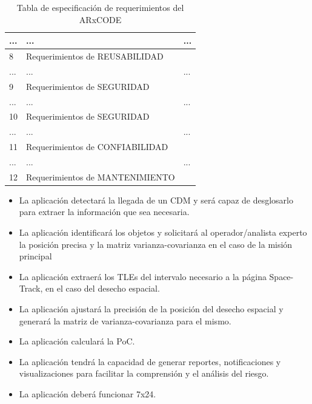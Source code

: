 \begin{table}
{\begin{tabular}{|l|l|l|}
  \hline
  ...&...&...\\
  \hline
  8 & Requerimientos de REUSABILIDAD & \\
  \hline
  ...&...&...\\
  \hline
  9 & Requerimientos de SEGURIDAD & \\
  \hline
  ...&...&...\\
  \hline
  10 & Requerimientos de SEGURIDAD & \\
  \hline
    ...&...&...\\
  \hline
  11 & Requerimientos de CONFIABILIDAD & \\
  \hline
  ...&...&...\\
  \hline
  12 & Requerimientos de MANTENIMIENTO & \\
  \hline
 \end{tabular}
 }
 \caption[Tabla de Requerimientos]{Tabla de especificaci\'on de requerimientos del ARxCODE}
\end{table}





\begin{itemize}
\item La aplicaci\'on detectar\'a la llegada de un CDM y ser\'a capaz de desglosarlo para extraer la informaci\'on que sea necesaria.\\
\item La aplicaci\'on identificar\'a los objetos y solicitar\'a al operador/analista experto la posici\'on precisa y la matriz varianza-covarianza en el caso de la misi\'on principal\\
\item La aplicaci\'on extraer\'a los TLEs del intervalo necesario a la p\'agina Space-Track, en el caso del desecho espacial.\\
\item La aplicaci\'on ajustar\'a la precisi\'on de la posici\'on del desecho espacial y generar\'a la matriz de varianza-covarianza para el mismo.\\
\item La aplicaci\'on calcular\'a la PoC.\\
\item La aplicaci\'on tendr\'a la capacidad de generar reportes, notificaciones y visualizaciones para facilitar la comprensi\'on y el an\'alisis del riesgo.
\item La aplicaci\'on deber\'a funcionar 7x24.
\end{itemize}


